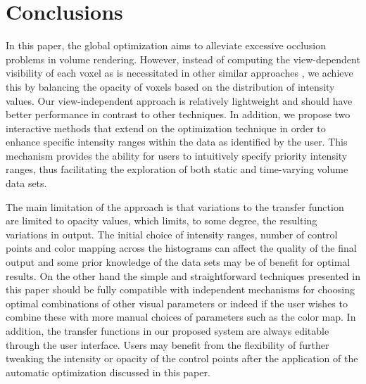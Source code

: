 \section{Conclusions}

In this paper, the global optimization aims to alleviate excessive occlusion problems in volume rendering. However, instead of computing the view-dependent visibility of each voxel as is necessitated in other similar approaches \cite{correa_visibility_2011} \cite{ruiz_automatic_2011}, we achieve this by balancing the opacity of voxels based on the distribution of intensity values. Our view-independent approach is relatively lightweight and should have better performance in contrast to other techniques.
In addition, we propose two interactive methods that extend on the optimization technique in order to enhance specific intensity ranges within the data as identified by the user.
This mechanism provides the ability for users to intuitively specify priority intensity ranges, thus facilitating the exploration of both static and time-varying volume data sets.

The main limitation of the approach is that variations to the transfer function are limited to opacity values, which limits, to some degree, the resulting variations in output. The initial choice of intensity ranges, number of control points and color mapping across the histograms can affect the quality of the final output and some prior knowledge of the data sets may be of benefit for optimal results. On the other hand the simple and straightforward techniques presented in this paper should be fully compatible with independent mechanisms for choosing optimal combinations of other visual parameters or indeed if the user wishes to combine these with more manual choices of parameters such as the color map.
In addition, the transfer functions in our proposed system are always editable through the user interface. Users may benefit from the flexibility of further tweaking the intensity or opacity of the control points after the application of the automatic optimization discussed in this paper.

